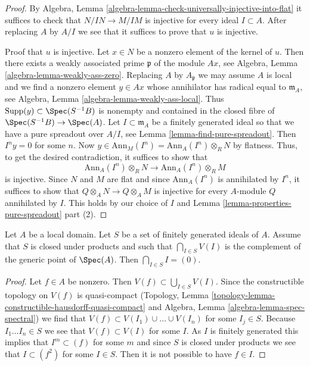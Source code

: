 \begin{proof}
By Algebra, Lemma \ref{algebra-lemma-check-universally-injective-into-flat}
it suffices to check that $N/IN \to M/IM$ is injective for every
ideal $I \subset A$. After replacing $A$ by $A/I$ we see that it suffices
to prove that $u$ is injective.

\medskip\noindent
Proof that $u$ is injective. Let $x \in N$ be a nonzero element of the
kernel of $u$. Then there exists a weakly associated prime $\mathfrak p$
of the module $Ax$, see Algebra, Lemma \ref{algebra-lemma-weakly-ass-zero}.
Replacing $A$ by $A_\mathfrak p$ we may assume $A$ is local and
we find a nonzero element $y \in Ax$ whose annihilator has radical
equal to $\mathfrak m_A$, see
Algebra, Lemma \ref{algebra-lemma-weakly-ass-local}.
Thus $\text{Supp}(y) \subset \Spec(S^{-1}B)$ is nonempty and
contained in the closed fibre of $\Spec(S^{-1}B) \to \Spec(A)$.
Let $I \subset \mathfrak m_A$ be a
finitely generated ideal so that we have a pure spreadout over $A/I$, see
Lemma \ref{lemma-find-pure-spreadout}. Then $I^n y = 0$ for some $n$. Now
$y \in \text{Ann}_M(I^n) = \text{Ann}_A(I^n) \otimes_R N$ by flatness.
Thus, to get the desired contradiction, it suffices to show that
$$
\text{Ann}_A(I^n) \otimes_R N
\longrightarrow
\text{Ann}_A(I^n) \otimes_R M
$$
is injective. Since $N$ and $M$ are flat and since $\text{Ann}_A(I^n)$
is annihilated by $I^n$, it suffices to show that
$Q \otimes_A N \to Q \otimes_A M$ is injective for every $A$-module
$Q$ annihilated by $I$. This holds by our choice of $I$ and
Lemma \ref{lemma-properties-pure-spreadout} part (2).
\end{proof}

\begin{lemma}
\label{lemma-big-intersection-is-zero}
Let $A$ be a local domain. Let $S$ be a set of finitely generated ideals
of $A$. Assume that $S$ is closed under products and such that
$\bigcap_{I \in S} V(I)$ is the complement of the generic point of $\Spec(A)$.
Then $\bigcap_{I \in S} I = (0)$.
\end{lemma}

\begin{proof}
Let $f \in A$ be nonzero. Then $V(f) \subset \bigcup_{I \in S} V(I)$.
Since the constructible topology on $V(f)$ is quasi-compact
(Topology, Lemma \ref{topology-lemma-constructible-hausdorff-quasi-compact}
and
Algebra, Lemma \ref{algebra-lemma-spec-spectral})
we find that $V(f) \subset V(I_1) \cup \ldots \cup V(I_n)$
for some $I_j \in S$. Because $I_1 \ldots I_n \in S$ we see that
$V(f) \subset V(I)$ for some $I$. As $I$ is finitely generated
this implies that $I^m \subset (f)$ for some $m$ and since
$S$ is closed under products we see that $I \subset (f^2)$ for
some $I \in S$. Then it is not possible to have $f \in I$.
\end{proof}

